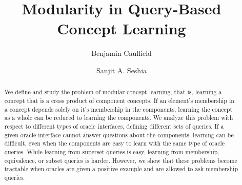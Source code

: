 \documentclass[runningheads]{llncs}
\begin{document}
\raggedbottom

%
\title{Modularity in Query-Based Concept Learning} %
%
%
\author{Benjamin Caulfield\and
Sanjit A. Seshia
}
%
%
%
\maketitle              %
%
\begin{abstract}
We define and study the problem of modular concept learning, that is, learning a concept that is a cross product of component concepts.
If an element's membership in a concept depends solely on it's membership in the components, learning the concept as a whole can be reduced to learning the components. 
We analyze this problem with respect to different types of oracle interfaces, defining different sets of queries.
If a given oracle interface cannot answer questions about the components, learning can be difficult, even when the components are easy to learn with the same type of oracle queries.
While learning from superset queries is easy, learning from membership, equivalence, or subset queries is harder. 
However, we show that these problems become tractable when oracles are given a positive example and are allowed to ask membership queries.
\end{abstract}
\end{document}

